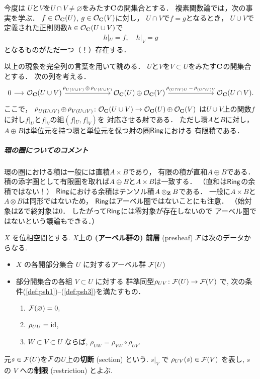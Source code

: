今度は
$U$と$V$を$U\cap V\neq\varnothing$をみたす$\mathbf{C}$の開集合とする．
複素関数論では，次の事実を学ぶ．
$f\in\mathcal{O}_{\mathbf{C}}(U)$, $g\in\mathcal{O}_{\mathbf{C}}(V)$に対し，
$U\cap V$で$f=g$となるとき，
$U\cup V$で定義された正則関数$h\in\mathcal{O}_{\mathbf{C}}(U\cup V)$で
\begin{align*}
    h|_U=f,\quad h|_V=g
\end{align*}
となるものがただ一つ（！）存在する．

以上の現象を完全列の言葉を用いて眺める．
$U$と$V$を$V\subset U$をみたす$\mathbf{C}$の開集合とする．
次の列を考える．
\begin{equation}
    \begin{tikzcd}%
        0 
        \arrow[r] 
        &[-0.03\linewidth]
        \OO_{\cc}(U\cup V)
        \arrow[r,"\res_{U(U\cup V)}\oplus\res_{V(U\cup V)}"]
        &[0.12\linewidth]
        \OO_{\cc}(U)\oplus\OO_{\cc}(V)
        \arrow[r, "\res_{(U\cap V)U}-\res_{(U\cap V)V}"] 
        &[0.12\linewidth]
        \OO_{\cc}(U\cap V).
    \end{tikzcd}
\end{equation}
ここで，
$\mathop{\rho}\nolimits_{U(U\cup V)}\oplus\mathop{\rho}\nolimits_{V(U\cup V)}\colon\mathcal{O}_{\mathbf{C}}(U\cup V)\to\mathcal{O}_{\mathbf{C}}(U)\oplus\mathcal{O}_{\mathbf{C}}(V)$
は$U\cup V$上の関数$f$に対し$f|_U$と$f|_V$の組$(f|_U,f|_V)$を
対応させる射である．
ただし環$A$と$B$に対し，
$A\oplus B$は単位元を持つ環と単位元を保つ射の圏$\mathop{\textsf{Ring}}\nolimits$における
有限積である．
\subparagraph{環の圏についてのコメント}
環の圏における積は一般には直積$A\times B$であり，
有限の積が直和$A\oplus B$である．
積の添字圏として有限圏を取れば$A\oplus B$と$A\times B$は一致する．
（直和は$\mathop{\textsf{Ring}}\nolimits$の余積ではない！）
$\mathop{\textsf{Ring}}\nolimits$における余積はテンソル積$A\otimes_{\mathbf{Z}} B$である．
一般に$A\times B$と$A\otimes B$は同形ではないため，
$\mathop{\textsf{Ring}}\nolimits$はアーベル圏ではないことにも注意．
（始対象は$\mathbf{Z}$で終対象は$0$．
したがって$\mathop{\textsf{Ring}}\nolimits$には零対象が存在しないので
アーベル圏ではないという議論もできる．）
\begin{Definition}\label{def-psh}
    $X$ を位相空間とする. 
    $X$上の \textbf{(アーベル群の) 前層} (presheaf) 
    $\mathcal{F}$は次のデータからなる. 
    \begin{itemize}
        \item $X$ の各開部分集合 $U$ に対するアーベル群 $\mathcal{F}(U)$
        \item 部分開集合の各組 $V \subset U$ に対する
        群準同型$\rho_{UV} \colon \mathcal{F}(U)\to \mathcal{F}(V)$
        で, 次の条件(\ref{def:psh1})--(\ref{def:psh3})を満たすもの．
        \begin{enumerate}
            \renewcommand{\labelenumi}{({\arabic{enumi}})}
            \item $\mathcal{F}(\varnothing) = 0,$\label{def:psh1} 
            \item $\rho_{UU} = \mathop{\mathrm{id}}\nolimits$, \label{def:psh2}
            \item $W \subset V \subset U$ ならば, \label{def:psh3}
            $\rho_{UW} = \rho_{VW} \circ \rho_{UV}$.
        \end{enumerate}
    \end{itemize}
    元$s\in \mathcal{F}(U)$を$\mathcal{F}$の$U$上の\textbf{切断} (section) という. 
    $s|_V$ で $\rho_{UV}(s)\in\mathcal{F}(V)$ を表し, 
    $s$ の $V$ への\textbf{制限} (restriction) とよぶ. 
\end{Definition}
